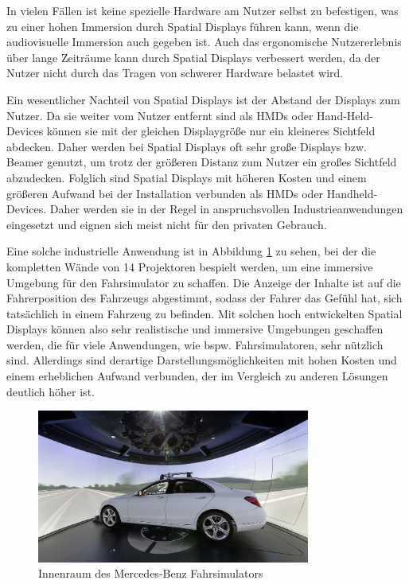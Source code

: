  In vielen Fällen ist keine spezielle Hardware am Nutzer selbst zu befestigen, was zu einer hohen Immersion durch Spatial Displays führen kann, wenn die audiovisuelle Immersion auch gegeben ist.
  Auch das ergonomische Nutzererlebnis über lange Zeiträume kann durch Spatial Displays verbessert werden, da der Nutzer nicht durch das Tragen von schwerer Hardware belastet wird.

  Ein wesentlicher Nachteil von Spatial Displays ist der Abstand der Displays zum Nutzer.
  Da sie weiter vom Nutzer entfernt sind als HMDs oder Hand-Held-Devices können sie mit der gleichen Displaygröße nur ein kleineres Sichtfeld abdecken.
  Daher werden bei Spatial Displays oft sehr große Displays bzw. Beamer genutzt, um trotz der größeren Distanz zum Nutzer ein großes Sichtfeld abzudecken.
  Folglich sind Spatial Displays mit höheren Kosten und einem größeren Aufwand bei der Installation verbunden als HMDs oder Handheld-Devices.
  Daher werden sie in der Regel in anspruchsvollen Industrieanwendungen eingesetzt und eignen sich meist nicht für den privaten Gebrauch.

  Eine solche industrielle Anwendung ist in Abbildung \ref{fig:merc-sim} zu sehen, bei der die kompletten Wände von 14 Projektoren bespielt werden, um eine immersive Umgebung für den Fahrsimulator zu schaffen.
  Die Anzeige der Inhalte ist auf die Fahrerposition des Fahrzeugs abgestimmt, sodass der Fahrer das Gefühl hat, sich tatsächlich in einem Fahrzeug zu befinden.
  Mit solchen hoch entwickelten Spatial Displays können also sehr realistische und immersive Umgebungen geschaffen werden, die für viele Anwendungen, wie bspw. Fahrsimulatoren, sehr nützlich sind.
  Allerdings sind derartige Darstellungsmöglichkeiten mit hohen Kosten und einem erheblichen Aufwand verbunden, der im Vergleich zu anderen Lösungen deutlich höher ist.

  \begin{figure}[H]
    \centering
    \includegraphics[width=0.8\textwidth]{images/merc-sim.png}
    \caption{Innenraum des Mercedes-Benz Fahrsimulators}
    \label{fig:merc-sim}
  \end{figure}


